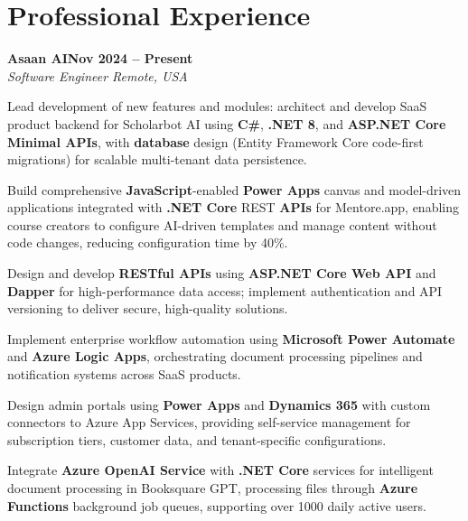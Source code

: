 \documentclass[letterpaper,10pt]{article}
\newcommand{\headingBf}[2]{
  \hspace{10pt}\textbf{#1}\hfill\textbf{#2}\\
}
\newcommand{\headingIt}[2]{
  \hspace{10pt}\textit{#1}\hfill\textit{#2}\\
}
\newenvironment{resume_list}{
  \vspace{-7pt}
  \begin{itemize}[itemsep=-2px, parsep=1pt, leftmargin=30pt]
}{
  \end{itemize}
}
\begin{document}
\section{Professional Experience}

\headingBf{Asaan AI}{Nov 2024 -- Present}
\headingIt{Software Engineer \hfill Remote, USA}{}
\begin{resume_list}
    \item Lead development of new features and modules: architect and develop SaaS product backend for Scholarbot AI using \textbf{C\#}, \textbf{.NET 8}, and \textbf{ASP.NET Core Minimal APIs}, with \textbf{database} design (Entity Framework Core code-first migrations) for scalable multi-tenant data persistence.
    \item Build comprehensive \textbf{JavaScript}-enabled \textbf{Power Apps} canvas and model-driven applications integrated with \textbf{.NET Core} REST \textbf{APIs} for Mentore.app, enabling course creators to configure AI-driven templates and manage content without code changes, reducing configuration time by 40\%.
    \item Design and develop \textbf{RESTful APIs} using \textbf{ASP.NET Core Web API} and \textbf{Dapper} for high-performance data access; implement authentication and API versioning to deliver secure, high-quality solutions.
    \item Implement enterprise workflow automation using \textbf{Microsoft Power Automate} and \textbf{Azure Logic Apps}, orchestrating document processing pipelines and notification systems across SaaS products.
    \item Design admin portals using \textbf{Power Apps} and \textbf{Dynamics 365} with custom connectors to Azure App Services, providing self-service management for subscription tiers, customer data, and tenant-specific configurations.
    \item Integrate \textbf{Azure OpenAI Service} with \textbf{.NET Core} services for intelligent document processing in Booksquare GPT, processing files through \textbf{Azure Functions} background job queues, supporting over 1000 daily active users.
\end{resume_list}
\end{document}
